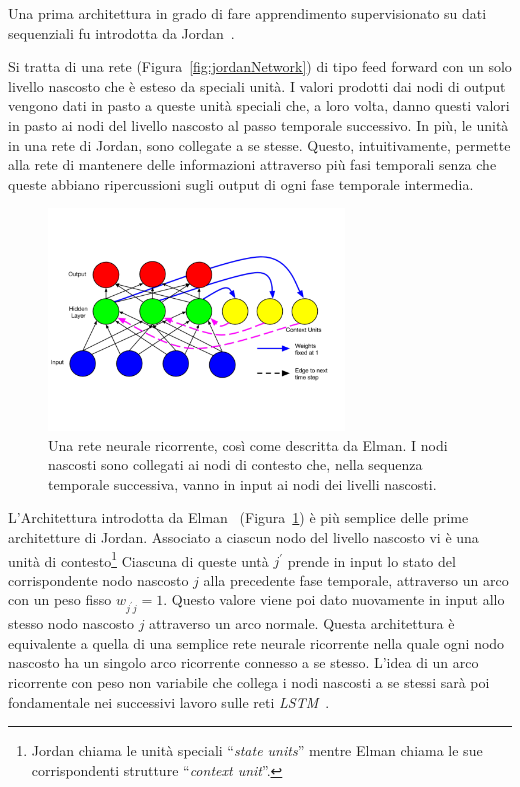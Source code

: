 Una prima architettura in grado di fare apprendimento supervisionato su dati
sequenziali fu introdotta da Jordan~\cite{Jordan:1986}.

Si tratta di una rete (Figura~\ref{fig:jordanNetwork}) di tipo feed forward
con un solo livello nascosto che \`e esteso da speciali unit\`a. I valori prodotti
dai nodi di output vengono dati in pasto a queste unit\`a speciali che, a loro
volta, danno questi valori in pasto ai nodi del livello nascosto al passo temporale
successivo. In pi\`u, le unit\`a in una rete di Jordan, sono collegate a se stesse.
Questo, intuitivamente, permette alla rete di mantenere delle informazioni attraverso
pi\`u fasi temporali senza che queste abbiano ripercussioni sugli output di ogni
fase temporale intermedia.

\begin{figure}[tp]
  \centering
  \begin{center}
    \includegraphics[width=0.7\textwidth]{./images/elmanNetwork.png}
  \end{center}
  \caption{Una rete neurale ricorrente, cos\`i come descritta da Elman.
  I nodi nascosti sono collegati ai nodi di contesto che, nella sequenza temporale
  successiva, vanno in input ai nodi dei livelli nascosti.}
  \label{fig:elmanNetwork}
\end{figure}

L'Architettura introdotta da Elman~\cite{Elman:1990} (Figura~\ref{fig:elmanNetwork}) \`e pi\`u semplice delle prime
architetture di Jordan. Associato a ciascun nodo del livello nascosto vi \`e una
unit\`a di contesto\footnote{Jordan chiama le unit\`a speciali ``\emph{state units}''
mentre Elman chiama le sue corrispondenti strutture ``\emph{context unit}''.}
Ciascuna di queste unt\`a $j^{'}$ prende in input lo stato del corrispondente
nodo nascosto $j$ alla precedente fase temporale, attraverso un arco con un peso
fisso $w_{j^{'}j} = 1$. Questo valore viene poi dato nuovamente in input allo
stesso nodo nascosto $j$ attraverso un arco normale. Questa architettura \`e
equivalente a quella di una semplice rete neurale ricorrente nella quale ogni
nodo nascosto ha un singolo arco ricorrente connesso a se stesso. L'idea di un
arco ricorrente con peso non variabile che collega i nodi nascosti a se stessi
sar\`a poi fondamentale nei successivi lavoro sulle reti \emph{LSTM}~\cite{Hochreiter:1997}.

